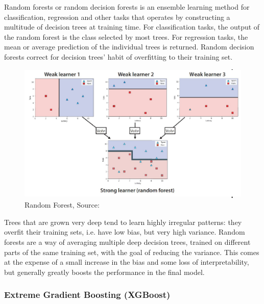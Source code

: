         Random forests or random decision forests is an ensemble learning method for classification, regression and other tasks that operates by constructing a multitude of decision trees at training time. For classification tasks, the output of the random forest is the class selected by most trees. For regression tasks, the mean or average prediction of the individual trees is returned. Random decision forests correct for decision trees' habit of overfitting to their training set.\par\vspace{1em}
        
        \begin{figure}
            \centering
            \includegraphics[width=1\linewidth]{graphics//chapter3/random forest.png}
            \caption{Random Forest, Source: \cite{gml}}
            \label{fig:random-forest}
        \end{figure}
        
         Trees that are grown very deep tend to learn highly irregular patterns: they overfit their training sets, i.e. have low bias, but very high variance. Random forests are a way of averaging multiple deep decision trees, trained on different parts of the same training set, with the goal of reducing the variance. This comes at the expense of a small increase in the bias and some loss of interpretability, but generally greatly boosts the performance in the final model\cite{rf-1}\cite{rf-2}.\par\vspace{1em}
        
        \subsubsection{Extreme Gradient Boosting (XGBoost)}   

